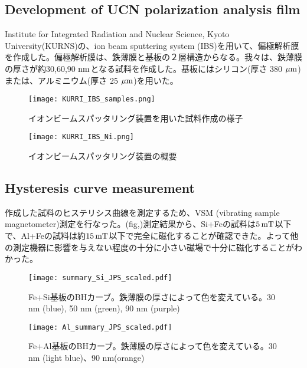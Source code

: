 \documentclass[onecolumn]{preport}
\begin{document}
\subsection{Development of UCN polarization analysis film}

Institute for Integrated Radiation and Nuclear Science, Kyoto University(KURNS)の、ion beam sputtering system (IBS)を用いて、偏極解析膜を作成した。\cite{Hino}偏極解析膜は、鉄薄膜と基板の２層構造からなる。我々は、鉄薄膜の厚さが約30,60,90 $\rm nm $となる試料を作成した。基板にはシリコン(厚さ 380 $\rm \mu m $)または、アルミニウム(厚さ 25 $\rm \mu m $)を用いた。

\begin{figure}[tbh]
 \centering
 \begin{minipage}{0.3\columnwidth}
  \texttt{[image: KURRI\_IBS\_samples.png]}
  \caption{イオンビームスパッタリング装置を用いた試料作成の様子}
 \end{minipage}
 \centering
 \hspace{0.15\columnwidth}
 \begin{minipage}{0.3\columnwidth}
  \texttt{[image: KURRI\_IBS\_Ni.png]}
  \caption{イオンビームスパッタリング装置の概要}
 \end{minipage}
\end{figure}

\subsection{Hysteresis curve measurement}
作成した試料のヒステリシス曲線を測定するため、VSM (vibrating sample magnetometer)測定を行なった。(fig,)測定結果から、Si+Feの試料は$5\,\rm mT$以下
で、Al+Feの試料は約$15\,\rm mT$以下で完全に磁化することが確認できた。よって他の測定機器に影響を与えない程度の十分に小さい磁場で十分に磁化することがわかった。

\begin{figure}[tbh]
 \centering
 \begin{minipage}{0.2\columnwidth}
  \texttt{[image: summary\_Si\_JPS\_scaled.pdf]}
  \caption{Fe+Si基板のBHカーブ。鉄薄膜の厚さによって色を変えている。30 nm (blue), 50 nm (green), 90 nm (purple)}
 \end{minipage}
 \hspace{0.15\columnwidth}
 \centering
 \begin{minipage}{0.2\columnwidth}
  \texttt{[image: Al\_summary\_JPS\_scaled.pdf]}
  \caption{Fe+Al基板のBHカーブ。鉄薄膜の厚さによって色を変えている。30 nm (light blue)、90 nm(orange)}
 \end{minipage}
\end{figure}
\end{document}
